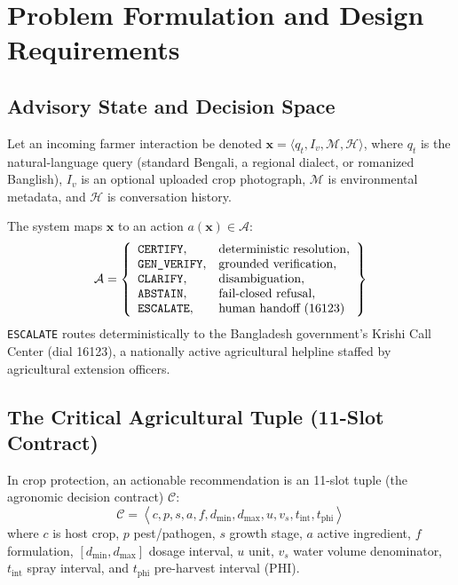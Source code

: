
\section{Problem Formulation and Design Requirements}
\label{sec:problem_formulation}

\subsection{Advisory State and Decision Space}
Let an incoming farmer interaction be denoted $\mathbf{x} = \langle q_t, I_v, \mathcal{M}, \mathcal{H} \rangle$, where $q_t$ is the natural-language query (standard Bengali, a regional dialect, or romanized Banglish), $I_v$ is an optional uploaded crop photograph, $\mathcal{M}$ is environmental metadata, and $\mathcal{H}$ is conversation history.

The system maps $\mathbf{x}$ to an action $a(\mathbf{x}) \in \mathcal{A}$:
\begin{equation}
    \mathcal{A} = \left\{ 
    \begin{array}{ll}
        \text{\texttt{CERTIFY}}, & \text{deterministic resolution},\\
        \text{\texttt{GEN\_VERIFY}}, & \text{grounded verification},\\
        \text{\texttt{CLARIFY}}, & \text{disambiguation},\\
        \text{\texttt{ABSTAIN}}, & \text{fail-closed refusal},\\
        \text{\texttt{ESCALATE}}, & \text{human handoff (16123)}
    \end{array}
    \right\}
\end{equation}
\texttt{ESCALATE} routes deterministically to the Bangladesh government's Krishi Call Center (dial 16123), a nationally active agricultural helpline staffed by agricultural extension officers.

\subsection{The Critical Agricultural Tuple (11-Slot Contract)}
In crop protection, an actionable recommendation is an 11-slot tuple (the agronomic decision contract) $\mathcal{C}$:
\begin{equation}
    \mathcal{C} = \left\langle 
    c, p, s, a, f, d_{\min}, d_{\max}, u, v_s, t_{\text{int}}, t_{\text{phi}}
    \right\rangle
\end{equation}
where $c$ is host crop, $p$ pest/pathogen, $s$ growth stage, $a$ active ingredient, $f$ formulation, $[d_{\min}, d_{\max}]$ dosage interval, $u$ unit, $v_s$ water volume denominator, $t_{\text{int}}$ spray interval, and $t_{\text{phi}}$ pre-harvest interval (PHI).

